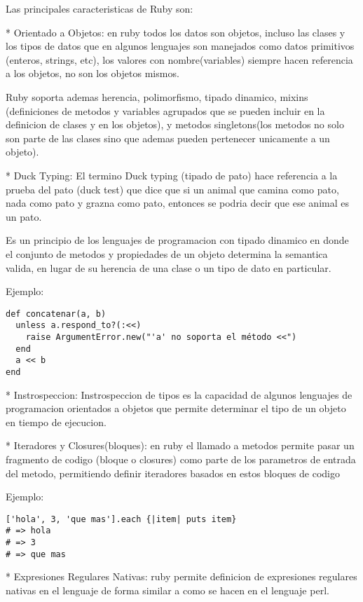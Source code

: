 Las principales caracteristicas de Ruby son:

* Orientado a Objetos: en ruby todos los datos son objetos, incluso las clases y los tipos de datos que en algunos lenguajes son manejados como datos primitivos (enteros, strings, etc), los valores con nombre(variables) siempre hacen referencia a los objetos, no son los objetos mismos.

Ruby soporta ademas herencia, polimorfismo, tipado dinamico, mixins (definiciones de metodos y variables agrupados que se pueden incluir en la definicion de clases y en los objetos), y metodos singletons(los metodos no solo son parte de las clases sino que ademas pueden pertenecer unicamente a un objeto).

* Duck Typing: El termino Duck typing (tipado de pato) hace referencia a la prueba del pato (duck test) que dice que si un animal que camina como pato, nada como pato y grazna como pato, entonces se podria decir que ese animal es un pato.

Es un principio de los lenguajes de programacion con tipado dinamico en donde el conjunto de metodos y propiedades de un objeto determina la semantica valida, en lugar de su herencia de una clase o un tipo de dato en particular.

Ejemplo:

\begin{verbatim}
def concatenar(a, b)
  unless a.respond_to?(:<<)
    raise ArgumentError.new("'a' no soporta el método <<")
  end
  a << b
end
\end{verbatim}

* Instrospeccion: Instrospeccion de tipos es la capacidad de algunos lenguajes de programacion orientados a objetos que permite determinar el tipo de un objeto en tiempo de ejecucion.

* Iteradores y Closures(bloques): en ruby el llamado a metodos permite pasar un fragmento de codigo (bloque o closures) como parte de los parametros de entrada del metodo, permitiendo definir iteradores basados en estos bloques de codigo

Ejemplo:

\begin{verbatim}
['hola', 3, 'que mas'].each {|item| puts item}
# => hola
# => 3
# => que mas
\end{verbatim}


* Expresiones Regulares Nativas: ruby permite definicion de expresiones regulares nativas en el lenguaje de forma similar a como se hacen en el lenguaje perl.


